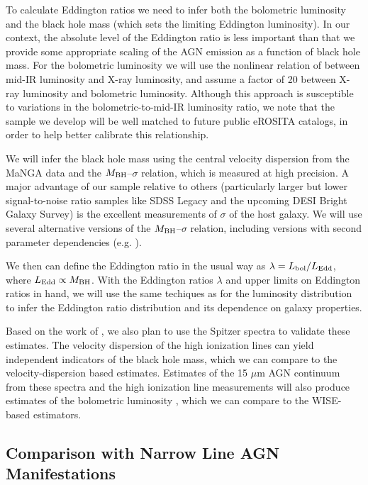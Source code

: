 \documentclass[12pt, preprint]{hacked-aastex}
\begin{document}
To calculate Eddington ratios we need to infer both the bolometric
luminosity and the black hole mass (which sets the limiting Eddington
luminosity). In our context, the absolute level of the Eddington ratio
is less important than that we provide some appropriate scaling of the
AGN emission as a function of black hole mass.  For the bolometric
luminosity we will use the nonlinear relation of \cite{stern15a}
between mid-IR luminosity and X-ray luminosity, and assume a factor of
20 between X-ray luminosity and bolometric luminosity. Although this
approach is susceptible to variations in the bolometric-to-mid-IR
luminosity ratio, we note that the sample we develop will be well
matched to future public eROSITA catalogs, in order to help better
calibrate this relationship.

We will infer the black hole mass using the central velocity
dispersion from the MaNGA data and the $M_{\rm BH}$--$\sigma$
relation, which is measured at high precision.  A major advantage of
our sample relative to others (particularly larger but lower
signal-to-noise ratio samples like SDSS Legacy and the upcoming DESI
Bright Galaxy Survey) is the excellent measurements of $\sigma$ of the
host galaxy. We will use several alternative versions of the $M_{\rm
  BH}$--$\sigma$ relation, including versions with second parameter
dependencies (e.g. \cite{kormendy13a, vandenbosch16a}).

We then can define the Eddington ratio in the usual way as $\lambda =
L_{\rm bol} / L_{\rm Edd}$, where $L_{\rm Edd}\propto M_{\rm BH}$.
With the Eddington ratios $\lambda$ and upper limits on Eddington
ratios in hand, we will use the same techiques as for the luminosity
distribution to infer the Eddington ratio distribution and its
dependence on galaxy properties.

Based on the work of \cite{dasyra08a}, we also plan to use the Spitzer
spectra to validate these estimates.  The velocity dispersion of the
high ionization lines can yield independent indicators of the black
hole mass, which we can compare to the velocity-dispersion based
estimates. Estimates of the 15 $\mu$m AGN continuum from these spectra
and the high ionization line measurements will also produce estimates
of the bolometric luminosity \cite{dasyra08a, shen20a}, which we can
compare to the WISE-based estimators. 

\subsection{Comparison with Narrow Line AGN Manifestations}
\label{sec:other}
\end{document}
